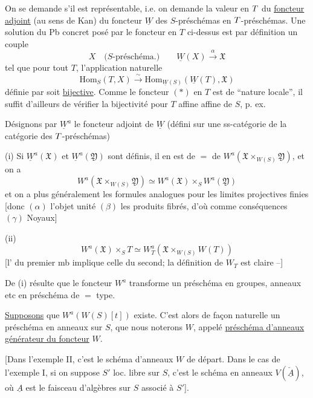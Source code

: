 On  se demande s'il est représentable, i.e. on demande la valeur en $T$ du \uline{foncteur adjoint} (au sens de Kan) du foncteur $\underline W$ des $S$-préschémas en $T$-préschémas. Une solution du Pb concret posé par le foncteur en $T$ ci-dessus est par définition un couple
\[
X\quad\text{($S$-préschéma.)}\qquad \underline W(X)\xrightarrow{\alpha}\mathfrak X
\]
tel que pour tout $T$, l'application naturelle
\[
\mathrm{Hom}_S(T,X)\xrightarrow{\sim}\mathrm{Hom}_{\underline W(S)}(\underline W(T),\mathfrak X)
\]
 définie par 
soit \uline{bijective}. Comme le foncteur $(\ast)$ en $T$ est de ``nature locale'', il suffit d'ailleurs de vérifier la bijectivité pour $T$ affine   affine de $S$, p. ex.

Désignons par $\underline W^a$ le foncteur adjoint de $\underline W$ (défini sur une ss-catégorie de la catégorie des $T$-préschémas)

(i) Si $\underline W^a(\mathfrak X)$ et $\underline W^a(\mathfrak Y)$ sont définis, il en est de $=$ de $W^a(\mathfrak X\times_{W(S)}\mathfrak Y)$, et on a
\[
W^a(\mathfrak X\times_{W(S)}\mathfrak Y)\simeq
W^a(\mathfrak X)\times_S W^a(\mathfrak Y)
\]
et on a plus généralement  les formules analogues pour les limites projectives finies [donc $(\alpha)$ l'objet unité $(\beta)$ les produits fibrés, d'où comme conséquences $(\gamma)$ Noyaux]

(ii)
\[
W^a(\mathfrak X)\times_S T\simeq W_T^a(\mathfrak X\times_{W(S)}W(T))
\]
[l' du premier mb implique celle du second; la définition de $W_T$ est claire --]

De (i) résulte que le foncteur $W^a$ transforme un préschéma en groupes, anneaux etc en préschéma de $=$ type.

\uline{Supposons} que $W^a(W(S)[t])$ existe. C'est alors de façon naturelle un préschéma en anneaux sur $S$, que nous noterons $W$, appelé \uline{préschéma d'anneaux générateur du foncteur} $W$.

[Dans l'exemple II, c'est le schéma d'anneaux $W$ de départ. Dans le cas de l'exemple I,  si  on suppose $S'$  loc. libre sur $S$, c'est le  schéma en anneaux $V(\check{\underline A})$, où $\underline A$ est le faisceau d'algèbres sur $S$ associé à $S'$].

